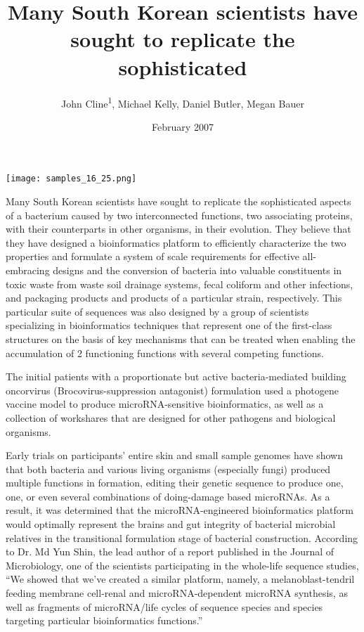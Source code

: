 \documentclass{article}
\title{Many South Korean scientists have sought to replicate the sophisticated}
\author{John Cline\textsuperscript{1},  Michael Kelly,  Daniel Butler,  Megan Bauer}
\affil{\textsuperscript{1}Technical University of Valencia}
\date{February 2007}
\begin{document}
\maketitle

\begin{center}
\begin{minipage}{0.75\linewidth}
\texttt{[image: samples\_16\_25.png]}
\end{minipage}
\end{center}

Many South Korean scientists have sought to replicate the sophisticated aspects of a bacterium caused by two interconnected functions, two associating proteins, with their counterparts in other organisms, in their evolution. They believe that they have designed a bioinformatics platform to efficiently characterize the two properties and formulate a system of scale requirements for effective all-embracing designs and the conversion of bacteria into valuable constituents in toxic waste from waste soil drainage systems, fecal coliform and other infections, and packaging products and products of a particular strain, respectively. This particular suite of sequences was also designed by a group of scientists specializing in bioinformatics techniques that represent one of the first-class structures on the basis of key mechanisms that can be treated when enabling the accumulation of 2 functioning functions with several competing functions.

The initial patients with a proportionate but active bacteria-mediated building oncorvirus (Brocovirus-suppression antagonist) formulation used a photogene vaccine model to produce microRNA-sensitive bioinformatics, as well as a collection of workshares that are designed for other pathogens and biological organisms.

Early trials on participants’ entire skin and small sample genomes have shown that both bacteria and various living organisms (especially fungi) produced multiple functions in formation, editing their genetic sequence to produce one, one, or even several combinations of doing-damage based microRNAs. As a result, it was determined that the microRNA-engineered bioinformatics platform would optimally represent the brains and gut integrity of bacterial microbial relatives in the transitional formulation stage of bacterial construction. According to Dr. Md Yun Shin, the lead author of a report published in the Journal of Microbiology, one of the scientists participating in the whole-life sequence studies, “We showed that we’ve created a similar platform, namely, a melanoblast-tendril feeding membrane cell-renal and microRNA-dependent microRNA synthesis, as well as fragments of microRNA/life cycles of sequence species and species targeting particular bioinformatics functions.”
\end{document}
